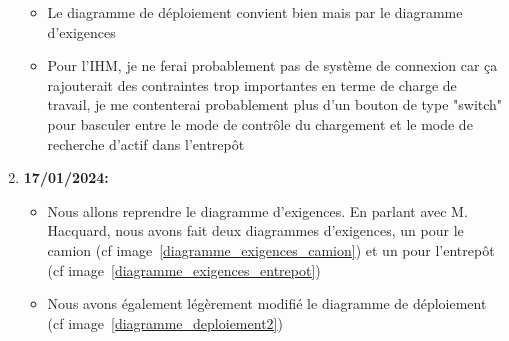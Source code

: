 \documentclass[10pt,a4paper]{book}
\begin{document}
\begin{enumerate}
\begin{itemize}
            \item Le diagramme de déploiement convient bien mais par le diagramme d'exigences
            \item Pour l'IHM, je ne ferai probablement pas de système de connexion car ça rajouterait des contraintes trop importantes en terme de charge de travail, je me contenterai probablement plus d'un bouton de type "switch" pour basculer entre le mode de contrôle du chargement et le mode de recherche d'actif dans l'entrepôt
        \end{itemize}
    \item \textbf{17/01/2024:}
        \begin{itemize}
            \item Nous allons reprendre le diagramme d'exigences. En parlant avec M. Hacquard, nous avons fait deux diagrammes d'exigences, un pour le camion (cf image~\ref{diagramme_exigences_camion}) et un pour l'entrepôt (cf image~\ref{diagramme_exigences_entrepot})
            \item Nous avons également légèrement modifié le diagramme de déploiement (cf image~\ref{diagramme_deploiement2})
        \end{itemize}
    
    \newpage
    

\end{enumerate}
\end{document}
